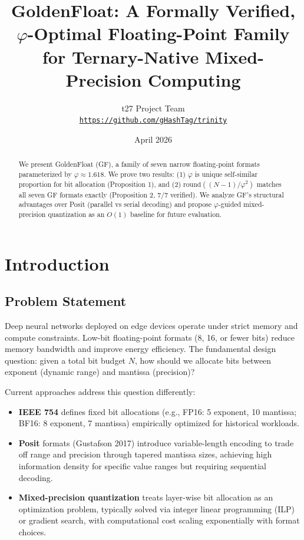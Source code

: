 \documentclass{article}
\title{\textbf{GoldenFloat: A Formally Verified, $\varphi$-Optimal Floating-Point Family for Ternary-Native Mixed-Precision Computing}}
\author{
t27 Project Team \\
\texttt{\href{https://github.com/gHashTag/trinity}{https://github.com/gHashTag/trinity}}
}
\date{April 2026}
\begin{document}
\maketitle

\begin{abstract}
We present GoldenFloat (GF), a family of seven narrow floating-point formats parameterized by $\varphi \approx 1.618$. We prove two results: (1) $\varphi$ is unique self-similar proportion for bit allocation (Proposition 1), and (2) $\text{round}((N-1)/\varphi^2)$ matches all seven GF formats exactly (Proposition 2, 7/7 verified). We analyze GF's structural advantages over Posit (parallel vs serial decoding) and propose $\varphi$-guided mixed-precision quantization as an $O(1)$ baseline for future evaluation.
\end{abstract}


\section{Introduction}

\subsection{Problem Statement}

Deep neural networks deployed on edge devices operate under strict memory and compute constraints. Low-bit floating-point formats (8, 16, or fewer bits) reduce memory bandwidth and improve energy efficiency. The fundamental design question: given a total bit budget $N$, how should we allocate bits between exponent (dynamic range) and mantissa (precision)?

Current approaches address this question differently:
\begin{itemize}
    \item \textbf{IEEE 754} defines fixed bit allocations (e.g., FP16: 5 exponent, 10 mantissa; BF16: 8 exponent, 7 mantissa) empirically optimized for historical workloads.
    \item \textbf{Posit} formats (Gustafson 2017) introduce variable-length encoding to trade off range and precision through tapered mantissa sizes, achieving high information density for specific value ranges but requiring sequential decoding.
    \item \textbf{Mixed-precision quantization} treats layer-wise bit allocation as an optimization problem, typically solved via integer linear programming (ILP) or gradient search, with computational cost scaling exponentially with format choices.
\end{itemize}
\end{document}
